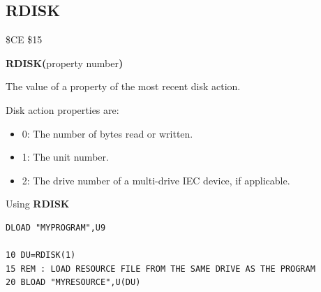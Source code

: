 \subsection{RDISK}
\begin{description}[leftmargin=2cm,style=nextline]
\item [Token:]    \$CE \$15

\item [Format:]   {\bf RDISK(}property number{\bf)}

\item [Returns:]  The value of a property of the most recent disk action.

                  Disk action properties are:
                  \begin{itemize}
                     \item 0: The number of bytes read or written.
                     \item 1: The unit number.
                     \item 2: The drive number of a multi-drive IEC device, if applicable.
                  \end{itemize}

\item [Example:]  Using {\bf RDISK}

\begin{tcolorbox}[colback=black,coltext=white]
\verbatimfont{\codefont}
\begin{verbatim}
DLOAD "MYPROGRAM",U9

10 DU=RDISK(1)
15 REM : LOAD RESOURCE FILE FROM THE SAME DRIVE AS THE PROGRAM
20 BLOAD "MYRESOURCE",U(DU)
\end{verbatim}
\end{tcolorbox}
\end{description}



\newpage
